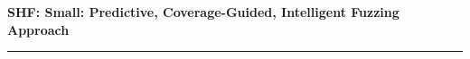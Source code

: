 \documentclass[11pt]{article}
\begin{document}
\begin{center}


{\large \bf SHF: Small: Predictive, Coverage-Guided, Intelligent Fuzzing Approach}
\end{center}
\vspace{-.1in}
\hrule

%









\newpage
\setcounter{page}{1}




%
\end{document}
